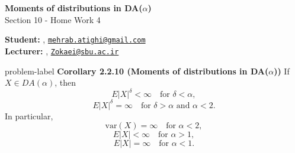 	






		\begin{Large}
		\textsf{\textbf{Moments of distributions in DA($\alpha$)}}\\
		Section 10 - Home Work 4
	\end{Large}
	
	\vspace{1ex}
	
	\textsf{\textbf{Student:}} , \href{mailto:mehrab.atighi@gmail.com}{\texttt{mehrab.atighi@gmail.com}}\\
	\textsf{\textbf{Lecturer:}} , \href{mailto:Zokaei@sbu.ac.ir}{\texttt{Zokaei@sbu.ac.ir}}
	
	
	\vspace{2ex}
	
	\begin{problem}{}{problem-label}
				\textbf{Corollary 2.2.10 (Moments of distributions in DA($\alpha$))} If $X \in DA(\alpha)$, then \[ E|X|^\delta < \infty \quad \text{for } \delta < \alpha, \] \[ E|X|^\delta = \infty \quad \text{for } \delta > \alpha \text{ and } \alpha < 2. \] In particular, \[ \text{var}(X) = \infty \quad \text{for } \alpha < 2, \] \[ E|X| < \infty \quad \text{for } \alpha > 1, \] \[ E|X| = \infty \quad \text{for } \alpha < 1. \]
				\cite{Embrechts.etal1997}
	\end{problem}
	
